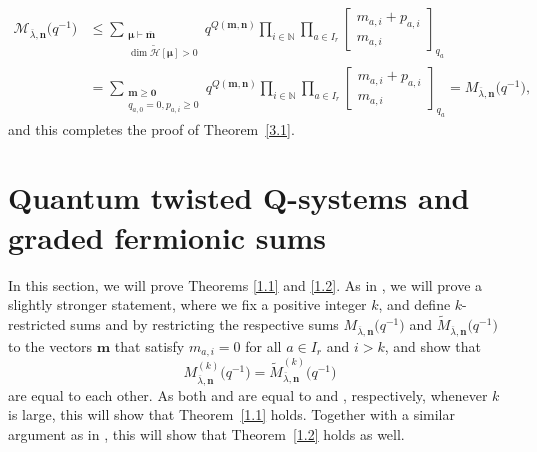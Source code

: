 \documentclass[10pt,a4paper]{amsart}
\numberwithin{equation}{section}
\begin{document}
\begin{align*}
\mathcal{M}_{\overline{\lambda},\mathbf{n}}\bigl(q^{-1}\bigr)
&\leq \sum_{\substack{\bm{\mu}\vdash \overline{\mathbf{m}}\\ \dim\tilde{\mathcal{H}}[\bm{\mu}]>0}} q^{Q( \mathbf{m},\mathbf{n})}\prod_{i\in\mathbb{N}}\prod_{a\in I_r} \begin{bmatrix} m_{a,i}+p_{a,i}\\m_{a,i}\end{bmatrix}_{q_a}\\
&=\sum_{\substack{\mathbf{m}\geq\mathbf{0}\\q_{a,0}=0,p_{a,i}\geq0}}q^{Q(\mathbf{m},\mathbf{n})}\prod_{i\in \mathbb{N}}\prod_{a\in I_r}\begin{bmatrix}m_{a,i}+p_{a,i}\\ m_{a,i}\end{bmatrix}_{q_a}=M_{\overline{\lambda},\mathbf{n}}\bigl(q^{-1}\bigr),
\end{align*}
and this completes the proof of Theorem~\ref{3.1}.

\section[Quantum twisted Q-systems and graded fermionic sums]{Quantum twisted $\boldsymbol{Q}$-systems and graded fermionic sums}\label{Section 4}

In this section, we will prove Theorems \ref{1.1} and \ref{1.2}. As in \cite{DFK08, DFK14, Lin21}, we will prove a slightly stronger statement, where we fix a positive integer $k$, and define $k$-restricted sums  and  by restricting the respective sums $M_{\overline{\lambda}, \mathbf{n}}\bigl(q^{-1}\bigr)$ and $\tilde{M}_{\overline{\lambda}, \mathbf{n}}\bigl(q^{-1}\bigr)$ to the vectors $\mathbf{m}$ that satisfy $m_{a,i}=0$ for all $a\in I_r$ and $i>k$, and show that
\[
M_{\overline{\lambda}, \mathbf{n}}^{(k)}\bigl(q^{-1}\bigr)=\tilde{M}_{\overline{\lambda}, \mathbf{n}}^{(k)}\bigl(q^{-1}\bigr)
\]
 are equal to each other. As both  and  are equal to  and , respectively, whenever $k$ is large, this will show that Theorem~\ref{1.1} holds. Together with a similar argument as in \cite[Section~1]{Kedem11}, this will show that Theorem~\ref{1.2} holds as well.
\end{document}
